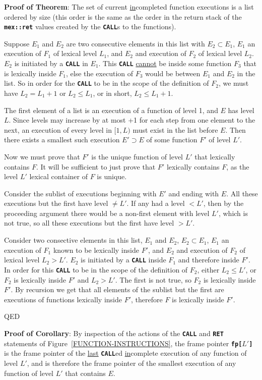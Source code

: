 \documentclass[12pt]{article}
\newcommand{\TT}[1]{{\tt \bfseries #1}}
\newenvironment{indpar}[1][0.3in]%
	{\begin{list}{}%
		     {\setlength{\itemsep}{0in}%
		      \setlength{\topsep}{0in}%
		      \setlength{\parsep}{1ex}%
		      \setlength{\labelwidth}{#1}%
		      \setlength{\leftmargin}{#1}%
		      \addtolength{\leftmargin}{\labelsep}}%
	 \item}%
	{\end{list}}
\begin{document}
\begin{indpar}
{\bf Proof of Theorem}:
The set of current \underline{in}completed function executions is a
list ordered by size (this order is the same as the order in the
return stack of the \TT{mex::ret} values created by the \TT{CALL}s
to the functions).

Suppose $E_1$ and $E_2$ are two consecutive
elements in this list with $E_2\subset E_1$, $E_1$ an execution of
$F_1$ of lexical level $L_1$, and $E_2$ and execution of
$F_2$ of lexical level $L_2$.  $E_2$ is initiated by a \TT{CALL}
in $E_1$.  This \TT{CALL}
\underline{cannot} be inside some function $F_3$ that is lexically
inside $F_1$, else the execution of $F_3$ would be between $E_1$
and $E_2$ in the list.  So in order for the \TT{CALL} to be in the
scope of the definition of $F_2$, we must have $L_2 = L_1+1$ or
$L_2\leq L_1$, or in short, $L_2\leq L_1+1$.

The first element of a list is an execution of a function of level
1, and $E$ has level $L$.  Since levels may increase by at most
+1 for each step from one element to the next, an execution of
every level in $[1,L)$ must exist in the list
before $E$.  Then there exists a smallest such execution $E'\supset E$ of
some function $F'$ of level $L'$.

Now we must prove that $F'$ is the unique function of level $L'$ that
lexically contains $F$.
It will be sufficient to just prove that $F'$ lexically contains $F$,
as the level $L'$ lexical container of $F$ is unique.

Consider the sublist of executions beginning with $E'$ and ending with
$E$.  All these executions but the first have level $\neq L'$.
If any had a level $<L'$, then by the proceeding argument there
would be a non-first element with level $L'$, which is not true,
so all these executions but the first have level $>L'$.

Consider two consective elements in this list, $E_1$ and $E_2$,
$E_2\subset E_1$, $E_1$ an execution of $F_1$ known to be lexically
inside $F'$, and $E_2$ and execution of
$F_2$ of lexical level $L_2>L'$.  $E_2$ is initiated by a \TT{CALL}
inside $F_1$ and therefore inside $F'$.
In order for this \TT{CALL}
to be in the scope of the definition of $F_2$, either $L_2\leq L'$,
or $F_2$ is lexically inside $F'$ and $L_2>L'$.
The first is not true,
so $F_2$ is lexically inside $F'$.  By recursion we get that all
elements of the sublist but the first are executions of functions
lexically inside $F'$, therefore $F$ is lexically inside $F'$.

QED

{\bf Proof of Corollary}:  By inspection of the actions of the \TT{CALL}
and \TT{RET} statements of Figure~\ref{FUNCTION-INSTRUCTIONS},
the frame pointer \TT{fp[$L'$]} is the frame pointer
of the \underline{last} \TT{CALL}ed \underline{in}complete execution
of any function of level $L'$, and is therefore the frame pointer
of the smallest execution of any function of level $L'$ that contains $E$.
\end{indpar}
\end{document}
